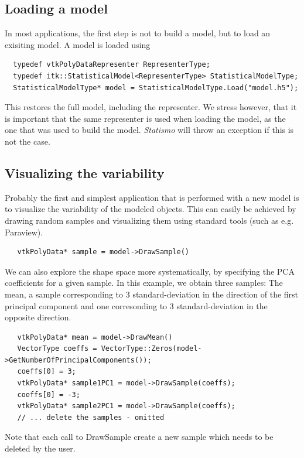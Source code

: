 \documentclass{InsightArticle}
\newcommand{\Statismo}{\emph{Statismo}\xspace}
\begin{document}
\subsection{Loading a model}
In most applications, the first step is not to build a model, but to load an exisiting model. 
A model is loaded using 
\begin{verbatim}
  typedef vtkPolyDataRepresenter RepresenterType;
  typedef itk::StatisticalModel<RepresenterType> StatisticalModelType;
  StatisticalModelType* model = StatisticalModelType.Load("model.h5");
\end{verbatim}
This restores the full model, including the representer. 
We stress however, that it is important that the same representer is used when loading the model, as the one that was used to build the model. 
\Statismo will throw an exception if this is not the case. 

\subsection{Visualizing the variability}
Probably the first and simplest application that is performed with a new model is to visualize the variability of the modeled objects. 
This can easily be achieved by drawing random samples and visualizing them using standard tools (such as e.g. Paraview). 
\begin{verbatim}
   vtkPolyData* sample = model->DrawSample()
\end{verbatim}
We can also explore the shape space more systematically, by specifying
the PCA coefficients for a given sample. In this example, we obtain three samples:
The mean, a sample corresponding to 3 standard-deviation in the direction of the
first principal component and one corresonding to 3 standard-deviation in the opposite direction.
\begin{verbatim}
   vtkPolyData* mean = model->DrawMean()
   VectorType coeffs = VectorType::Zeros(model->GetNumberOfPrincipalComponents());
   coeffs[0] = 3;
   vtkPolyData* sample1PC1 = model->DrawSample(coeffs);
   coeffs[0] = -3;
   vtkPolyData* sample2PC1 = model->DrawSample(coeffs);
   // ... delete the samples - omitted
\end{verbatim}
Note that each call to DrawSample create a new sample which needs to be deleted by the user.
\end{document}
